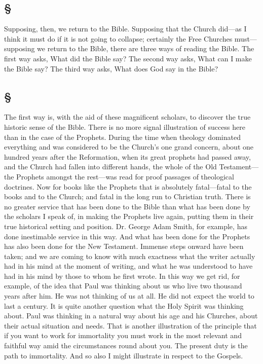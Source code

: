 \documentclass[draft]{ptfdoc}
\begin{document}
\subsection*{
\S
} 

Supposing, then, we return to the Bible. 
Supposing that the Church did---as I think it 
must do if it is not going to collapse; certainly 
the Free Churches must---supposing we return 
to the Bible, there are three ways of reading the 
Bible. The first way asks, What did the Bible 
say? The second way asks, What can I make 
the Bible say? The third way asks, What does 
God say in the Bible? 

\subsection*{
\S
} 

The first way is, with the aid of these magnificent 
scholars, to discover the true historic 
sense of the Bible. There is no more signal 
illustration of success here than in the case of 
the Prophets. During the time when theology 
dominated everything and was considered to 
be the Church's one grand concern, about one 
hundred years after the Reformation, when 
its great prophets had passed away, and the 
Church had fallen into different hands, the 
whole of the Old Testament---the Prophets 
amongst the rest---was read for proof passages 
of theological doctrines. Now for books like 
the Prophets that is absolutely fatal---fatal to 
the books and to the Church; and fatal in the 
long run to Christian truth. There is no greater 
service that has been done to the Bible than 
what has been done by the scholars I speak 
of, in making the Prophets live again, putting 
them in their true historical setting and position. 
Dr. George Adam Smith, for example, has done 
inestimable service in this way. And what 
has been done for the Prophets has also been 
done for the New Testament. Immense steps 
onward have been taken; and we are coming 
to know with much exactness what the writer 
actually had in his mind at the moment of 
writing, and what he was understood to have 
had in his mind by those to whom he first 
wrote. In this way we get rid, for example, 
of the idea that Paul was thinking about us 
who live two thousand years after him. He 
was not thinking of us at all. He did not 
expect the world to last a century. It is quite 
another question what the Holy Spirit was 
thinking about. Paul was thinking in a natural 
way about his age and his Churches, about their 
actual situation and needs. That is another 
illustration of the principle that if you want 
to work for immortality you must work in 
the most relevant and faithful way amid the 
circumstances round about you. The present 
duty is the path to immortality. And so also 
I might illustrate in respect to the Gospels. 
\end{document}
